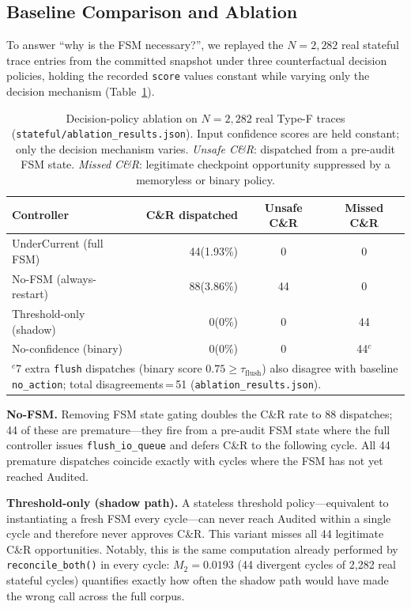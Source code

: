 \documentclass[conference]{IEEEtran}
\begin{document}
\subsection{Baseline Comparison and Ablation}
\label{sec:ablation}

To answer ``why is the FSM necessary?'', we replayed the $N = 2{,}282$ real stateful trace entries from the committed snapshot under three counterfactual decision policies, holding the recorded \texttt{score} values constant while varying only the decision mechanism (Table~\ref{tab:ablation}).

\begin{table}[t]
\caption{Decision-policy ablation on $N = 2{,}282$ real Type-F traces (\texttt{stateful/ablation\_results.json}). Input confidence scores are held constant; only the decision mechanism varies. \emph{Unsafe C\&R}: dispatched from a pre-audit FSM state. \emph{Missed C\&R}: legitimate checkpoint opportunity suppressed by a memoryless or binary policy.}
\label{tab:ablation}
\centering
\renewcommand{\arraystretch}{1.15}
\begin{tabular}{lrcc}
\hline
Controller & C\&R dispatched & Unsafe C\&R & Missed C\&R \\
\hline
UnderCurrent (full FSM) & 44\;(1.93\%) & 0 & 0 \\
No-FSM (always-restart) & 88\;(3.86\%) & 44 & 0 \\
Threshold-only (shadow) & 0\;\;\;(0\%) & 0 & 44 \\
No-confidence (binary)  & 0\;\;\;(0\%) & 0 & 44$^{c}$ \\
\hline
\multicolumn{4}{p{0.88\columnwidth}}{\footnotesize $^{c}$7 extra \texttt{flush} dispatches (binary score $0.75\geq\tau_{\mathrm{flush}}$) also disagree with baseline \texttt{no\_action}; total disagreements\,=\,51 (\texttt{ablation\_results.json}).} \\
\end{tabular}
\end{table}

\textbf{No-FSM.} Removing FSM state gating doubles the C\&R rate to 88 dispatches; 44 of these are premature---they fire from a pre-audit FSM state where the full controller issues \texttt{flush\_io\_queue} and defers C\&R to the following cycle. All 44 premature dispatches coincide exactly with cycles where the FSM has not yet reached Audited.

\textbf{Threshold-only (shadow path).} A stateless threshold policy---equivalent to instantiating a fresh FSM every cycle---can never reach Audited within a single cycle and therefore never approves C\&R. This variant misses all 44 legitimate C\&R opportunities. Notably, this is the same computation already performed by \texttt{reconcile\_both()} in every cycle: $M_2 = 0.0193$ (44 divergent cycles of 2,282 real stateful cycles) quantifies exactly how often the shadow path would have made the wrong call across the full corpus.
\end{document}
